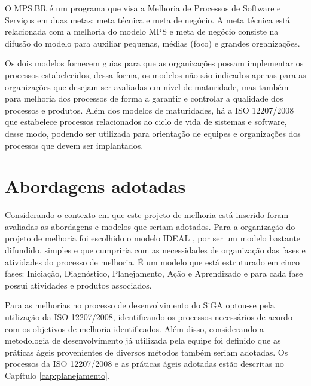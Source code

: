 O MPS.BR é um programa que visa a Melhoria de Processos de Software e Serviços em duas metas: meta técnica e meta de negócio. 
A meta técnica está relacionada com a melhoria do modelo MPS e meta de negócio consiste na difusão do modelo para auxiliar pequenas, 
médias (foco) e grandes organizações. \cite{mps_br}

Os dois modelos fornecem guias para que as organizações possam implementar os processos estabelecidos, dessa forma, os modelos
não são indicados apenas para as organizações que desejam ser avaliadas em nível de maturidade, mas também para melhoria dos processos
de forma a garantir e controlar a qualidade dos processos e produtos. Além dos modelos de maturidades, 
há a ISO 12207/2008 \cite{12207} que estabelece processos relacionados ao ciclo de vida de sistemas e software, desse modo, podendo
ser utilizada para orientação de equipes e organizações dos processos que devem ser implantados. 

\section{Abordagens adotadas}

Considerando o contexto em que este projeto de melhoria está inserido foram avaliadas as abordagens e modelos que seriam adotados. Para
a organização do projeto de melhoria foi escolhido o modelo IDEAL \cite{ideal}, por ser um modelo bastante difundido, simples e que 
cumpriria com as necessidades de organização das fases e atividades do processo de melhoria. É um modelo que está estruturado em cinco fases: 
Iniciação, Diagnóstico, Planejamento, Ação e Aprendizado e para cada fase possui atividades e produtos associados. 

Para as melhorias no processo de desenvolvimento do SiGA optou-se pela utilização da ISO 12207/2008, identificando os processos necessários
de acordo com os objetivos de melhoria identificados. Além disso,
considerando a metodologia de desenvolvimento já utilizada pela equipe foi definido que as práticas ágeis provenientes de diversos
métodos também seriam adotadas. Os processos da ISO 12207/2008 e as práticas ágeis adotadas estão descritas no Capítulo \ref{cap:planejamento}. 





